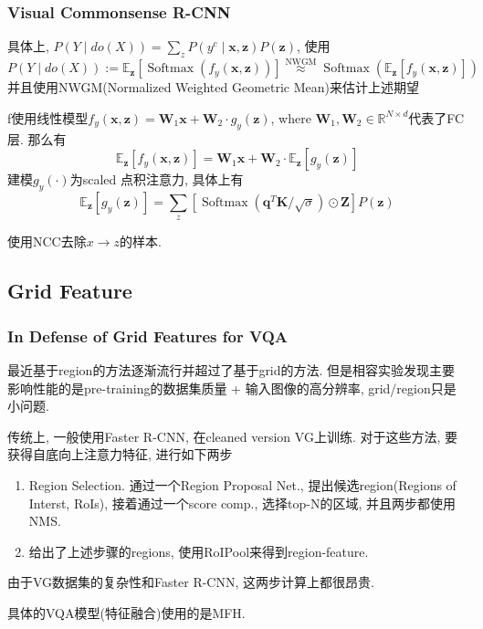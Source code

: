 \documentclass{beamer}
\begin{document}
\begin{frame}
    \frametitle{Visual Commonsense R-CNN}

    具体上, $P(Y \mid do(X)) = \sum_{z} P\left(y^{c} \mid \boldsymbol{x}, \boldsymbol{z}\right) P(\boldsymbol{z})$, 使用
    \begin{equation}
        P(Y \mid d o(X)):=\mathbb{E}_{\boldsymbol{z}}\left[\operatorname{Softmax}\left(f_{y}(\boldsymbol{x}, \boldsymbol{z})\right)\right]
        \stackrel{\mathrm{NWGM}}{\approx} \operatorname{Softmax}\left(\mathbb{E}_{\boldsymbol{z}}\left[f_{y}(\boldsymbol{x}, \boldsymbol{z})\right]\right)
    \end{equation}
    并且使用NWGM(Normalized Weighted Geometric Mean)来估计上述期望

    f使用线性模型$f_{y}(\boldsymbol{x}, \boldsymbol{z})=\boldsymbol{W}_{1} \boldsymbol{x}+\boldsymbol{W}_{2} \cdot g_{y}(\boldsymbol{z})$, where $\boldsymbol{W}_{1}, \boldsymbol{W}_{2} \in \mathbb{R}^{N \times d}$代表了FC层. 那么有
    \begin{equation}
        \mathbb{E}_{\boldsymbol{z}}\left[f_{y}(\boldsymbol{x}, \boldsymbol{z})\right]=\boldsymbol{W}_{1} \boldsymbol{x}+\boldsymbol{W}_{2} \cdot \mathbb{E}_{\boldsymbol{z}}\left[g_{y}(\boldsymbol{z})\right]
    \end{equation}
    建模$g_{y}(\cdot)$为scaled 点积注意力, 具体上有
    \begin{equation}
        \mathbb{E}_{\boldsymbol{z}}\left[g_{y}(\boldsymbol{z})\right]=\sum_{z}\left[\operatorname{Softmax}\left(\boldsymbol{q}^{T} \boldsymbol{K} / \sqrt{\sigma}\right) \odot \boldsymbol{Z}\right] P(\boldsymbol{z})
    \end{equation}

    使用NCC去除$x\to z$的样本.

\end{frame}

\subsection{Grid Feature}

\begin{frame}
    \frametitle{In Defense of Grid Features for VQA}

    最近基于region的方法逐渐流行并超过了基于grid的方法. 但是相容实验发现主要影响性能的是pre-training的数据集质量 + 输入图像的高分辨率, grid/region只是小问题.

    传统上, 一般使用Faster R-CNN, 在cleaned version VG上训练. 对于这些方法, 要获得自底向上注意力特征, 进行如下两步
    \begin{enumerate}
        \item Region Selection. 通过一个Region Proposal Net., 提出候选region(Regions of Interst, RoIs), 接着通过一个score comp., 选择top-N的区域, 并且两步都使用NMS.
        \item 给出了上述步骤的regions, 使用RoIPool来得到region-feature.
    \end{enumerate}
    由于VG数据集的复杂性和Faster R-CNN, 这两步计算上都很昂贵. 

    具体的VQA模型(特征融合)使用的是MFH.

\end{frame}
\end{document}
